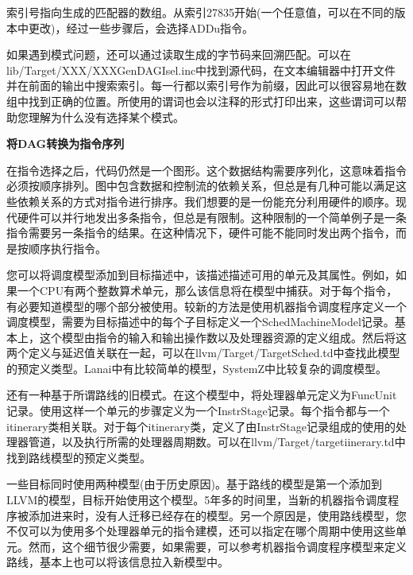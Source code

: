 索引号指向生成的匹配器的数组。从索引27835开始(一个任意值，可以在不同的版本中更改)，经过一些步骤后，会选择ADDu指令。\par

\begin{tcolorbox}[colback=blue!5!white,colframe=blue!75!black, title=模式匹配]
如果遇到模式问题，还可以通过读取生成的字节码来回溯匹配。可以在lib/Target/XXX/XXXGenDAGIsel.inc中找到源代码，在文本编辑器中打开文件并在前面的输出中搜索索引。每一行都以索引号作为前缀，因此可以很容易地在数组中找到正确的位置。所使用的谓词也会以注释的形式打印出来，这些谓词可以帮助您理解为什么没有选择某个模式。
\end{tcolorbox}

\hspace*{\fill} \par %
\textbf{将DAG转换为指令序列}

在指令选择之后，代码仍然是一个图形。这个数据结构需要序列化，这意味着指令必须按顺序排列。图中包含数据和控制流的依赖关系，但总是有几种可能以满足这些依赖关系的方式对指令进行排序。我们想要的是一份能充分利用硬件的顺序。现代硬件可以并行地发出多条指令，但总是有限制。这种限制的一个简单例子是一条指令需要另一条指令的结果。在这种情况下，硬件可能不能同时发出两个指令，而是按顺序执行指令。\par

您可以将调度模型添加到目标描述中，该描述描述可用的单元及其属性。例如，如果一个CPU有两个整数算术单元，那么该信息将在模型中捕获。对于每个指令，有必要知道模型的哪个部分被使用。较新的方法是使用机器指令调度程序定义一个调度模型，需要为目标描述中的每个子目标定义一个SchedMachineModel记录。基本上，这个模型由指令的输入和输出操作数以及处理器资源的定义组成。然后将这两个定义与延迟值关联在一起，可以在llvm/Target/TargetSched.td中查找此模型的预定义类型。Lanai中有比较简单的模型，SystemZ中比较复杂的调度模型。\par

还有一种基于所谓路线的旧模式。在这个模型中，将处理器单元定义为FuncUnit记录。使用这样一个单元的步骤定义为一个InstrStage记录。每个指令都与一个itinerary类相关联。对于每个itinerary类，定义了由InstrStage记录组成的使用的处理器管道，以及执行所需的处理器周期数。可以在llvm/Target/targetiinerary.td中找到路线模型的预定义类型。\par

一些目标同时使用两种模型(由于历史原因)。基于路线的模型是第一个添加到LLVM的模型，目标开始使用这个模型。5年多的时间里，当新的机器指令调度程序被添加进来时，没有人迁移已经存在的模型。另一个原因是，使用路线模型，您不仅可以为使用多个处理器单元的指令建模，还可以指定在哪个周期中使用这些单元。然而，这个细节很少需要，如果需要，可以参考机器指令调度程序模型来定义路线，基本上也可以将该信息拉入新模型中。\par

